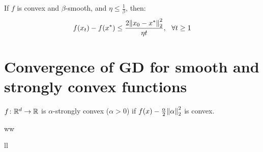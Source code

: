 \begin{theorem}
    If \(f\) is convex and \(\beta\)-smooth, and \(\eta \leq \frac{1}{\beta}\), then: 
    \[
        f(x_t) - f(x^*) \leq \frac{2 \norm{x_0 - x^*}_2^2}{\eta t}, \ \ \forall t \geq 1   
    \]    
\end{theorem}



\section{Convergence of GD for smooth and strongly convex functions}

\begin{definition}
    \(f \colon \mathbb{R}^d \to \mathbb{R}\) is \(\alpha\)-strongly convex (\(\alpha > 0\)) if 
    \(f(x) - \frac{\alpha}{2} \norm{\alpha}_2^2\) is convex. 
\end{definition}

\begin{lemma}
    ww  
\end{lemma}

ll